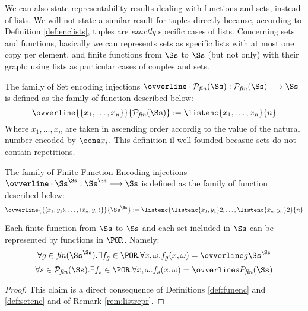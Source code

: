 \begin{conditional}{\notappendix}
  We can also state representability results dealing with
  functions and sets, instead of lists. We will not state a similar result for tuples directly
  because, according to Definition \ref{def:enclists}, tuples are \emph{exactly}
  specific cases of lists.
  Concerning sets and functions, basically we can represents sets as specific
  lists with at most
  one copy per element, and finite functions from $\Ss$ to $\Ss$ (but not only)
  with their graph: using lists as particular cases of couples and sets.
  \begin{defn}
    \label{def:setenc}
  The family of Set encoding injections
  $\ovverline \cdot {\mathcal P_\mathit{fin}(\Ss)}:   \mathcal P_\mathit{fin}(\Ss) \longrightarrow \Ss$
  is defined as the family of function described below:
  $$
  \ovverline {\{x_1,\ldots, x_n\}} {\mathcal P_\mathit{fin}(\Ss)}
  := \listenc {x_1,\ldots, x_n} {n}
  $$
  Where $x_1, \ldots, x_n$ are taken in ascending order accordig to the value
  of the natural number encoded by $\oone x_i$. This definition il well-founded
  becasue sets do not contain repetitions.
  \end{defn}

  \begin{defn}
    \label{def:funenc}
  The family of Finite Function Encoding injections
  $\ovverline \cdot {\Ss^\Ss}: \Ss^\Ss \longrightarrow \Ss$
  is defined as the family of function described below:
  $$
  \ovverline {\{\langle x_1, y_1\rangle,\ldots, \langle x_n, y_n\rangle\}} {\Ss^\Ss}
  := \listenc {\listenc {x_1, y_1} 2,\ldots, \listenc {x_n, y_n} 2} {n}
  $$
  \end{defn}

  \begin{cor}
    \label{cor:funsetrepr}
    Each finite function from $\Ss$ to $\Ss$ and each set included in $\Ss$ can
    be represented by functions in $\POR$. Namely:
    \[
    \forall g \in \mathit{fin}(\Ss^\Ss).
    \exists f_g \in \POR. \forall x, \omega.
     f_g(x, \omega) = \ovverline g {\Ss^\Ss}
    \]
    \[
    \forall s \in \mathcal P_\mathit{fin}(\Ss).
    \exists f_s \in \POR. \forall x, \omega.
     f_s(x, \omega) = \ovverline s {P_\mathit{fin}(\Ss)}
    \]

  \end{cor}
  \begin{proof}
    This claim is a direct consequence of Definitions \ref{def:funenc} and \ref{def:setenc}
    and of Remark \ref{rem:listrepr}.
  \end{proof}


\end{conditional}
